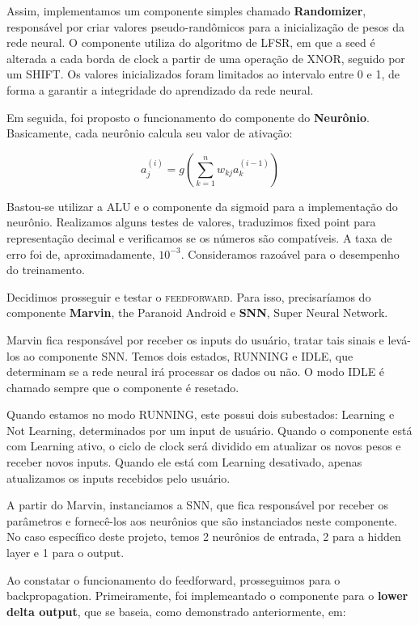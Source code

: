     Assim, implementamos um componente simples chamado \textbf{Randomizer}, responsável por criar valores pseudo-randômicos para a inicialização de pesos da rede neural. O componente utiliza do algoritmo de LFSR, em que a seed é alterada a cada borda de clock a partir de uma operação de \textsc{XNOR}, seguido por um \textsc{SHIFT}. Os valores inicializados foram limitados ao intervalo entre 0 e 1, de forma a garantir a integridade do aprendizado da rede neural.

    Em seguida, foi proposto o funcionamento do componente do \textbf{Neurônio}. Basicamente, cada neurônio calcula seu valor de ativação:

    \begin{equation}
        a^{(i)}_j = g\left(\sum_{k = 1}^{n} w_{kj} a^{(i-1)}_k\right)
    \end{equation}

    Bastou-se utilizar a ALU e o componente da sigmoid para a implementação do neurônio. Realizamos alguns testes de valores, traduzimos fixed point para representação decimal e verificamos se os números são compatíveis. A taxa de erro foi de, aproximadamente, $10^{-3}$. Consideramos razoável para o desempenho do treinamento.

    Decidimos prosseguir e testar o \textsc{feedforward}. Para isso, precisaríamos do componente \textbf{Marvin}, the Paranoid Android e \textbf{SNN}, Super Neural Network.

    Marvin fica responsável por receber os inputs do usuário, tratar tais sinais e levá-los ao componente SNN. Temos dois estados, RUNNING e IDLE, que determinam se a rede neural irá processar os dados ou não. O modo IDLE é chamado sempre que o componente é resetado.
    
    Quando estamos no modo RUNNING, este possui dois subestados: Learning e Not Learning, determinados por um input de usuário. Quando o componente está com Learning ativo, o ciclo de clock será dividido em atualizar os novos pesos e receber novos inputs. Quando ele está com Learning desativado, apenas atualizamos os inputs recebidos pelo usuário.

    A partir do Marvin, instanciamos a SNN, que fica responsável por receber os parâmetros e fornecê-los aos neurônios que são instanciados neste componente. No caso específico deste projeto, temos 2 neurônios de entrada, 2 para a hidden layer e 1 para o output.

    Ao constatar o funcionamento do feedforward, prosseguimos para o backpropagation. Primeiramente, foi implemeantado o componente para o \textbf{lower delta output}, que se baseia, como demonstrado anteriormente, em:

